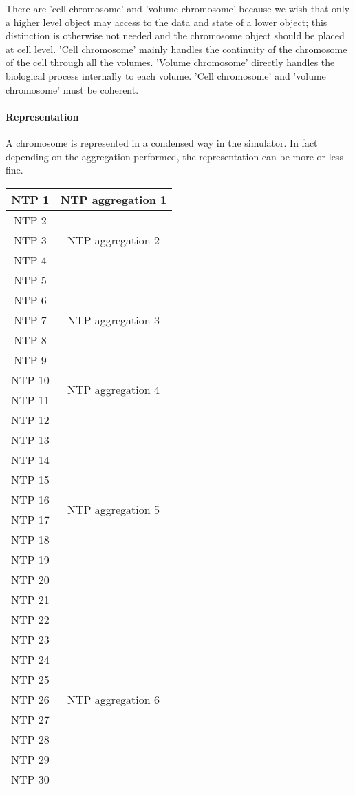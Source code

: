 There are 'cell chromosome' and 'volume chromosome' because we wish that only a higher level object may access to the data and state of a lower object; this distinction is otherwise not needed and the chromosome object should be placed at cell level. 'Cell chromosome' mainly handles the continuity of the chromosome of the cell through all the volumes. 'Volume chromosome' directly handles the biological process internally to each volume. 'Cell chromosome' and 'volume chromosome' must be coherent.


\paragraph{Representation} A chromosome is represented in a condensed way in the simulator. In fact depending on the aggregation performed, the representation can be more or less fine.
\begin{center}
\begin{tabular}{|c|c|}
  \hline
  NTP 1  & \multirow{1}{*}{NTP aggregation 1} \\
  \hline
  NTP 2  & \multirow{3}{*}{NTP aggregation 2} \\
  NTP 3  &  \\
  NTP 4  &  \\
  \hline
  NTP 5  & \multirow{5}{*}{NTP aggregation 3} \\
  NTP 6  &  \\
  NTP 7  &  \\
  NTP 8  &  \\
  NTP 9  &  \\
  \hline
  NTP 10 & \multirow{2}{*}{NTP aggregation 4} \\
  NTP 11 &  \\
  \hline
  NTP 12 & \multirow{10}{*}{NTP aggregation 5} \\
  NTP 13 &  \\
  NTP 14 &  \\
  NTP 15 &  \\
  NTP 16 &  \\
  NTP 17 &  \\
  NTP 18 &  \\
  NTP 19 &  \\
  NTP 20 &  \\
  NTP 21 &  \\
  \hline
  NTP 22 & \multirow{9}{*}{NTP aggregation 6} \\
  NTP 23 &  \\
  NTP 24 &  \\
  NTP 25 &  \\
  NTP 26 &  \\
  NTP 27 &  \\
  NTP 28 &  \\
  NTP 29 &  \\
  \hline
  NTP 30 & \multirow{1}{*}{NTP aggregation 7} \\
  \hline
\end{tabular}
\end{center}
